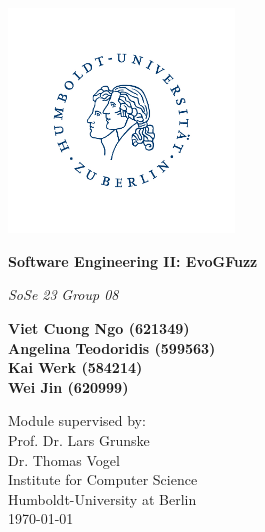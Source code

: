 \begin{titlepage}
    \begin{center}
        
        \includegraphics[width=6cm]{Png/HU_Siegel_RGB.jpg}
        
        \Huge
        \textbf{Software Engineering II: EvoGFuzz} 
        
        \vspace{0.8cm}
        \LARGE
        \textit{SoSe 23}
        \textit{Group 08}
        
        \vspace{0.5cm}

        \textbf{Viet Cuong Ngo (621349)} \\
        \textbf{Angelina Teodoridis (599563)} \\
        \textbf{Kai Werk (584214)} \\
        \textbf{Wei  Jin (620999)} \\
   		 
   	\vspace{0.5cm}

        Module supervised by: \\
        Prof. Dr. Lars Grunske \\
        Dr. Thomas Vogel \\
        
        \vspace{0.8cm}
          \Large
        Institute for Computer Science\\
        Humboldt-University at Berlin\\
        \vspace{0.5cm}
       \today
        
    \end{center}
\end{titlepage}